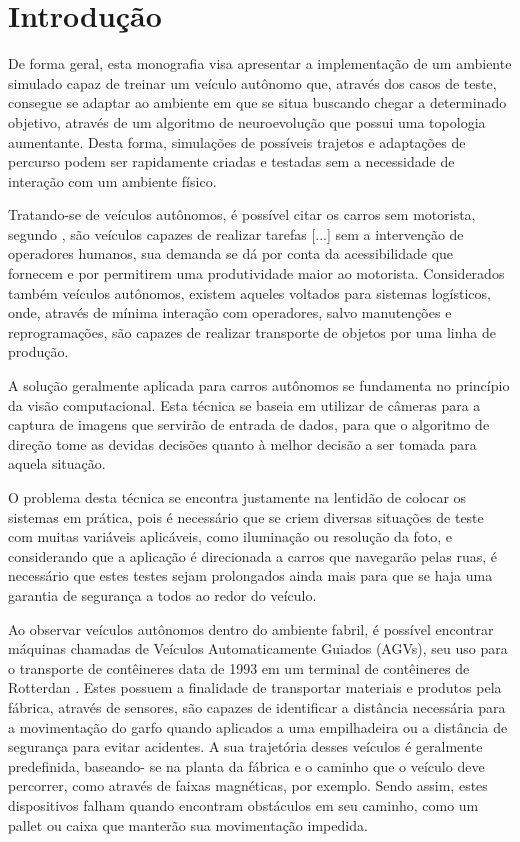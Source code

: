 \chapter{Introdução}

De forma geral, esta monografia visa apresentar a implementação de um
ambiente simulado capaz de treinar um veículo autônomo que, através dos
casos de teste, consegue se adaptar ao ambiente em que se situa buscando
chegar a determinado objetivo, através de um algoritmo de neuroevolução que
possui uma topologia aumentante. Desta forma, simulações de possíveis trajetos
e adaptações de percurso podem ser rapidamente criadas e testadas sem a
necessidade de interação com um ambiente físico.

Tratando-se de veículos autônomos, é possível citar os carros sem
motorista, segundo , são veículos capazes de realizar tarefas
[...] sem a intervenção de operadores humanos, sua demanda se dá por conta da 
acessibilidade que fornecem e por permitirem uma
produtividade maior ao motorista. Considerados também veículos autônomos,
existem aqueles voltados para sistemas logísticos, onde, através de mínima
interação com operadores, salvo manutenções e reprogramações, são capazes
de realizar transporte de objetos por uma linha de produção.

A solução geralmente aplicada para carros autônomos se fundamenta no
princípio da visão computacional. Esta técnica se baseia em utilizar de câmeras
para a captura de imagens que servirão de entrada de dados, para que o
algoritmo de direção tome as devidas decisões quanto à melhor decisão a ser
tomada para aquela situação.

O problema desta técnica se encontra justamente na lentidão de colocar
os sistemas em prática, pois é necessário que se criem diversas situações de
teste com muitas variáveis aplicáveis, como iluminação ou resolução da foto, e
considerando que a aplicação é direcionada a carros que navegarão pelas ruas,
é necessário que estes testes sejam prolongados ainda mais para que se haja
uma garantia de segurança a todos ao redor do veículo.

Ao observar veículos autônomos dentro do ambiente fabril, é possível
encontrar máquinas chamadas de Veículos Automaticamente Guiados (AGVs),
seu uso para o transporte de contêineres data de 1993 em um terminal de
contêineres de Rotterdan \cite{saputra2021}. Estes possuem a finalidade
de transportar materiais e produtos pela fábrica, através de sensores, são
capazes de identificar a distância necessária para a movimentação do garfo
quando aplicados a uma empilhadeira ou a distância de segurança para evitar
acidentes. A sua trajetória desses veículos é geralmente predefinida, baseando-
se na planta da fábrica e o caminho que o veículo deve percorrer, como através
de faixas magnéticas, por exemplo. Sendo assim, estes dispositivos falham
quando encontram obstáculos em seu caminho, como um pallet ou caixa que
manterão sua movimentação impedida.

